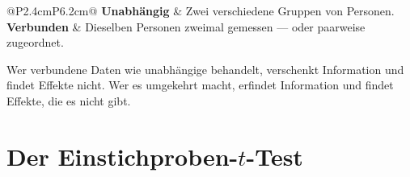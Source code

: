 \begin{warnung}
\begin{center}
\renewcommand{\arraystretch}{1.5}
\begin{tabular}{@{}P{2.4cm}P{6.2cm}@{}}
\toprule
\textbf{Unabhängig} & Zwei verschiedene Gruppen von Personen.\\
\textbf{Verbunden} & Dieselben Personen zweimal gemessen --- oder paarweise zugeordnet.\\
\bottomrule
\end{tabular}
\end{center}

Wer verbundene Daten wie unabhängige behandelt, verschenkt Information und findet Effekte nicht. Wer es umgekehrt macht, erfindet Information und findet Effekte, die es nicht gibt.

\begin{center}
\begin{minipage}{0.88\textwidth}
\end{minipage}
\end{center}
\end{warnung}

\section{Der Einstichproben-$t$-Test}

